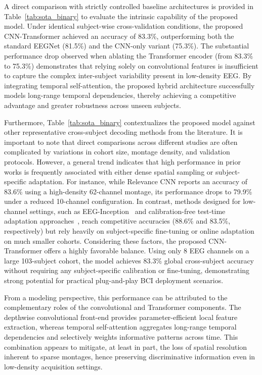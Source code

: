 \documentclass[a4paper,fleqn]{cas-dc}
\begin{document}
A direct comparison with strictly controlled baseline architectures is provided in Table~\ref{tab:sota_binary} to evaluate the intrinsic capability of the proposed model. Under identical subject-wise cross-validation conditions, the proposed CNN-Transformer achieved an accuracy of 83.3\%, outperforming both the standard EEGNet \citep{lawhern2018eegnet} (81.5\%) and the CNN-only variant (75.3\%). The substantial performance drop observed when ablating the Transformer encoder (from 83.3\% to 75.3\%) demonstrates that relying solely on convolutional features is insufficient to capture the complex inter-subject variability present in low-density EEG. By integrating temporal self-attention, the proposed hybrid architecture successfully models long-range temporal dependencies, thereby achieving a competitive advantage and greater robustness across unseen subjects.

Furthermore, Table~\ref{tab:sota_binary} contextualizes the proposed model against other representative cross-subject decoding methods from the literature. It is important to note that direct comparisons across different studies are often complicated by variations in cohort size, montage density, and validation protocols. However, a general trend indicates that high performance in prior works is frequently associated with either dense spatial sampling or subject-specific adaptation. For instance, while Relevance CNN \citep{nagarajan2023relevance} reports an accuracy of 83.6\% using a high-density 62-channel montage, its performance drops to 79.9\% under a reduced 10-channel configuration. In contrast, methods designed for low-channel settings, such as EEG-Inception~\citep{zhang2021eeg} and calibration-free test-time adaptation approaches~\citep{wimpff2024calibration}, reach competitive accuracies (88.6\% and 83.5\%, respectively) but rely heavily on subject-specific fine-tuning or online adaptation on much smaller cohorts. Considering these factors, the proposed CNN-Transformer offers a highly favorable balance. Using only 8 EEG channels on a large 103-subject cohort, the model achieves 83.3\% global cross-subject accuracy without requiring any subject-specific calibration or fine-tuning, demonstrating strong potential for practical plug-and-play BCI deployment scenarios.

From a modeling perspective, this performance can be attributed to the complementary roles of the convolutional and Transformer components. The depthwise convolutional front-end provides parameter-efficient local feature extraction, whereas temporal self-attention aggregates long-range temporal dependencies and selectively weights informative patterns across time. This combination appears to mitigate, at least in part, the loss of spatial resolution inherent to sparse montages, hence preserving discriminative information even in low-density acquisition settings.
\end{document}
